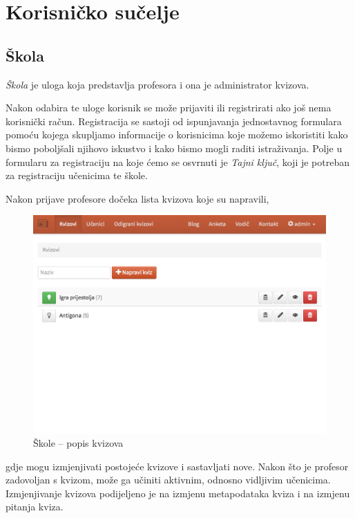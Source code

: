 \documentclass{scrreprt}
\begin{document}
\section{Korisničko sučelje}

\subsection{Škola}

\emph{Škola} je uloga koja predstavlja profesora i ona je administrator kvizova.


Nakon odabira te uloge korisnik se može prijaviti ili registrirati ako još nema
korisnički račun. Registracija se sastoji od ispunjavanja jednostavnog formulara
pomoću kojega skupljamo informacije o korisnicima koje možemo iskoristiti kako
bismo poboljšali njihovo iskustvo i kako bismo mogli raditi istraživanja. Polje
u formularu za registraciju na koje ćemo se osvrnuti je \emph{Tajni ključ}, koji
je potreban za registraciju učenicima te škole.

Nakon prijave profesore dočeka lista kvizova koje su napravili,

\begin{figure}[H]
  \includegraphics[width=\textwidth, clip=true, trim=0 10cm 0 0, fbox]{school/quizzes}
  \caption{Škole -- popis kvizova}
\end{figure}

gdje mogu izmjenjivati postojeće kvizove i sastavljati nove. Nakon što je
profesor zadovoljan s kvizom, može ga učiniti aktivnim, odnosno vidljivim
učenicima. Izmjenjivanje kvizova podijeljeno je na izmjenu metapodataka kviza i
na izmjenu pitanja kviza.
\end{document}
